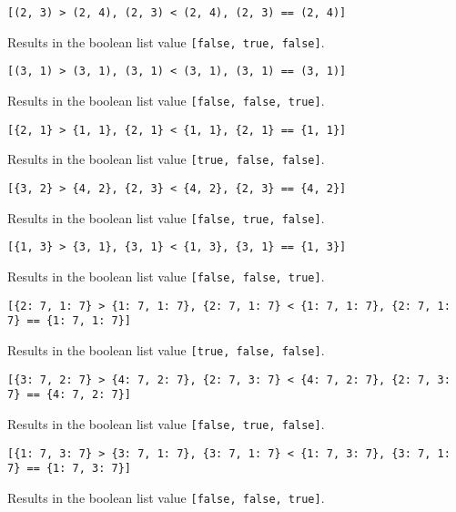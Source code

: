 {\begin{itemize}
{		\item[] \lstinline[language=MAIA, columns=fixed]@[(2, 3) > (2, 4), (2, 3) < (2, 4), (2, 3) == (2, 4)]@
		
			Results in the boolean list value \lstinline[language=MAIA, columns=fixed]@[false, true, false]@.
			
		\item[] \lstinline[language=MAIA, columns=fixed]@[(3, 1) > (3, 1), (3, 1) < (3, 1), (3, 1) == (3, 1)]@
		
			Results in the boolean list value \lstinline[language=MAIA, columns=fixed]@[false, false, true]@.
			
		\item[] \lstinline[language=MAIA, columns=fixed]@[{2, 1} > {1, 1}, {2, 1} < {1, 1}, {2, 1} == {1, 1}]@
		
			Results in the boolean list value \lstinline[language=MAIA, columns=fixed]@[true, false, false]@.
			
		\item[] \lstinline[language=MAIA, columns=fixed]@[{3, 2} > {4, 2}, {2, 3} < {4, 2}, {2, 3} == {4, 2}]@
		
			Results in the boolean list value \lstinline[language=MAIA, columns=fixed]@[false, true, false]@.
			
		\item[] \lstinline[language=MAIA, columns=fixed]@[{1, 3} > {3, 1}, {3, 1} < {1, 3}, {3, 1} == {1, 3}]@
		
			Results in the boolean list value \lstinline[language=MAIA, columns=fixed]@[false, false, true]@.
			
		\item[] \lstinline[language=MAIA, columns=fixed]@[{2: 7, 1: 7} > {1: 7, 1: 7}, {2: 7, 1: 7} < {1: 7, 1: 7}, {2: 7, 1: 7} == {1: 7, 1: 7}]@
		
			Results in the boolean list value \lstinline[language=MAIA, columns=fixed]@[true, false, false]@.
			
		\item[] \lstinline[language=MAIA, columns=fixed]@[{3: 7, 2: 7} > {4: 7, 2: 7}, {2: 7, 3: 7} < {4: 7, 2: 7}, {2: 7, 3: 7} == {4: 7, 2: 7}]@
		
			Results in the boolean list value \lstinline[language=MAIA, columns=fixed]@[false, true, false]@.
			
		\item[] \lstinline[language=MAIA, columns=fixed]@[{1: 7, 3: 7} > {3: 7, 1: 7}, {3: 7, 1: 7} < {1: 7, 3: 7}, {3: 7, 1: 7} == {1: 7, 3: 7}]@
		
			Results in the boolean list value \lstinline[language=MAIA, columns=fixed]@[false, false, true]@.
	}
	\end{itemize}
}



















